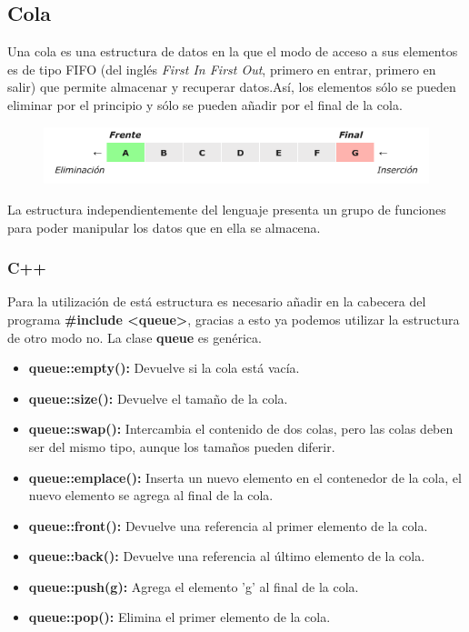 \subsection{Cola}

Una cola es una estructura de datos en la que el modo de acceso a sus elementos es de tipo FIFO
(del inglés \emph{First In First Out}, primero en entrar, primero en salir) que permite almacenar y recuperar
datos.Así, los elementos sólo se pueden eliminar por el principio y sólo se pueden añadir por el final
de la cola.

\begin{figure}[h!]
	\centering
	\includegraphics[width=0.7\linewidth]{img/cola}
	\label{fig:cola}
\end{figure}


La estructura independientemente del lenguaje presenta un grupo de funciones para poder manipular los datos que en ella se almacena.

\subsubsection{C++}

Para la utilización de está estructura es necesario añadir en la cabecera del programa \textbf{\#include
<queue>}, gracias a esto ya podemos utilizar la estructura de otro modo no. La clase \textbf{queue} es
genérica.

\begin{itemize}
	\item \textbf{queue::empty():} Devuelve si la cola está vacía.
	\item \textbf{queue::size():} Devuelve el tamaño de la cola.
	\item \textbf{queue::swap():} Intercambia el contenido de dos colas, pero las colas deben ser del mismo tipo, aunque los tamaños pueden diferir.
	\item \textbf{queue::emplace():} Inserta un nuevo elemento en el contenedor de la cola, el nuevo elemento se agrega al final de la cola.
	\item \textbf{queue::front():} Devuelve una referencia al primer elemento de la cola.
	\item \textbf{queue::back():} Devuelve una referencia al último elemento de la cola.
	\item \textbf{queue::push(g):} Agrega el elemento 'g' al final de la cola.
	\item \textbf{queue::pop():} Elimina el primer elemento de la cola.
\end{itemize}

